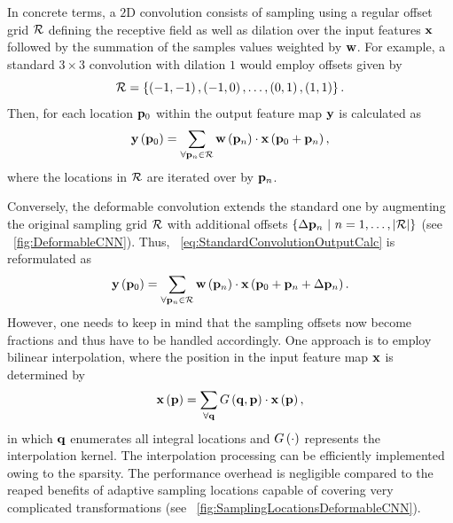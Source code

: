 In concrete terms, a $2$D convolution consists of sampling using a regular offset grid $\mathcal{R}$ defining the receptive field as well as dilation over the input features $\mathbf{x}$ followed by the summation of the samples values weighted by $\mathbf{w}$. For example, a standard $3 \times 3$ convolution with dilation $1$ would employ offsets given by
\begin{equation}
    \label{eq:StandardConvolutionOffsetGrid}
    \mathcal{R} = \left\{ {
        \left( {-1, -1} \right), \left( {-1, 0} \right), \dots, \left( {0, 1} \right), \left( {1, 1} \right)
    } \right\}.
\end{equation}
Then, for each location $\mathbf{p}_0$ within the output feature map $\mathbf{y}$ is calculated as
\begin{equation}
    \label{eq:StandardConvolutionOutputCalc}
    {\mathbf{y}} \left( \mathbf{p}_0 \right) =
    \sum_{\forall \mathbf{p}_n \in \mathcal{R}}
    {\mathbf{w}} \left( \mathbf{p}_n \right) \cdot {\mathbf{x}} \left( \mathbf{p}_0 + \mathbf{p}_n \right),
\end{equation}
where the locations in $\mathcal{R}$ are iterated over by $\mathbf{p}_n$.

Conversely, the deformable convolution extends the standard one by augmenting the original sampling grid $\mathcal{R}$ with additional offsets $\left\{ {\Delta \mathbf{p}_n \ |\ n = 1, \dots, \left\vert \mathcal{R} \right\vert} \right\}$ (see \figtext{}~\ref{fig:DeformableCNN}). Thus, \eqtext{}~\ref{eq:StandardConvolutionOutputCalc} is reformulated as
\begin{equation}
    \label{eq:DeformableConvolutionOutputCalc}
    {\mathbf{y}} \left( \mathbf{p}_0 \right) =
    \sum_{\forall \mathbf{p}_n \in \mathcal{R}}
    {\mathbf{w}} \left( \mathbf{p}_n \right) \cdot {\mathbf{x}} \left( \mathbf{p}_0 + \mathbf{p}_n + \Delta \mathbf{p}_n \right).
\end{equation}
However, one needs to keep in mind that the sampling offsets now become fractions and thus have to be handled accordingly. One approach is to employ bilinear interpolation, where the position in the input feature map $\mathbf{x}$ is determined by
\begin{equation}
    \label{eq:DeformableConvolutionBilinear}
    {\mathbf{x}} \left( \mathbf{p} \right) =
    \sum_{\forall \mathbf{q}} {G} \left( \mathbf{q}, \mathbf{p} \right) \cdot {\mathbf{x}} \left( \mathbf{p} \right),
\end{equation}
in which $\mathbf{q}$ enumerates all integral locations and ${G} \left( \cdot \right)$ represents the  interpolation kernel. The interpolation processing can be efficiently implemented owing to the sparsity. The performance overhead is negligible compared to the reaped benefits of adaptive sampling locations capable of covering very complicated transformations (see \figtext{}~\ref{fig:SamplingLocationsDeformableCNN}).

